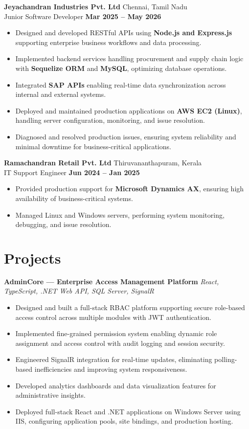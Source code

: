 \documentclass[letterpaper,10pt]{article}
\newcommand{\resumeItem}[1]{\item \small{#1}}
\newcommand{\resumeItemListStart}{\begin{itemize}[leftmargin=*, noitemsep, label={\color{accent}\textbullet}]}
\newcommand{\resumeItemListEnd}{\end{itemize}}
\newcommand{\duration}[1]{\textbf{\color{accent}#1}}
\begin{document}
\textbf{Jeyachandran Industries Pvt. Ltd} \hfill {\color{muted}Chennai, Tamil Nadu} \\
Junior Software Developer \hfill \duration{Mar 2025 -- May 2026}

\resumeItemListStart
\resumeItem{Designed and developed RESTful APIs using \textbf{Node.js and Express.js} supporting enterprise business workflows and data processing.}
\resumeItem{Implemented backend services handling procurement and supply chain logic with \textbf{Sequelize ORM} and \textbf{MySQL}, optimizing database operations.}
\resumeItem{Integrated \textbf{SAP APIs} enabling real-time data synchronization across internal and external systems.}
\resumeItem{Deployed and maintained production applications on \textbf{AWS EC2 (Linux)}, handling server configuration, monitoring, and issue resolution.}
\resumeItem{Diagnosed and resolved production issues, ensuring system reliability and minimal downtime for business-critical applications.}
\resumeItemListEnd

\textbf{Ramachandran Retail Pvt. Ltd} \hfill {\color{muted}Thiruvananthapuram, Kerala} \\
IT Support Engineer \hfill \duration{Jun 2024 -- Jan 2025}

\resumeItemListStart
\resumeItem{Provided production support for \textbf{Microsoft Dynamics AX}, ensuring high availability of business-critical systems.}
\resumeItem{Managed Linux and Windows servers, performing system monitoring, debugging, and issue resolution.}
\resumeItemListEnd

\section{Projects}

\textbf{AdminCore — Enterprise Access Management Platform}
\textit{\color{muted}React, TypeScript, .NET Web API, SQL Server, SignalR}
\resumeItemListStart
\resumeItem{Designed and built a full-stack RBAC platform supporting secure role-based access control across multiple modules with JWT authentication.}
\resumeItem{Implemented fine-grained permission system enabling dynamic role assignment and access control with audit logging and session security.}
\resumeItem{Engineered SignalR integration for real-time updates, eliminating polling-based inefficiencies and improving system responsiveness.}
\resumeItem{Developed analytics dashboards and data visualization features for administrative insights.}
\resumeItem{Deployed full-stack React and .NET applications on Windows Server using IIS, configuring application pools, site bindings, and production hosting.}
\resumeItemListEnd
\end{document}
